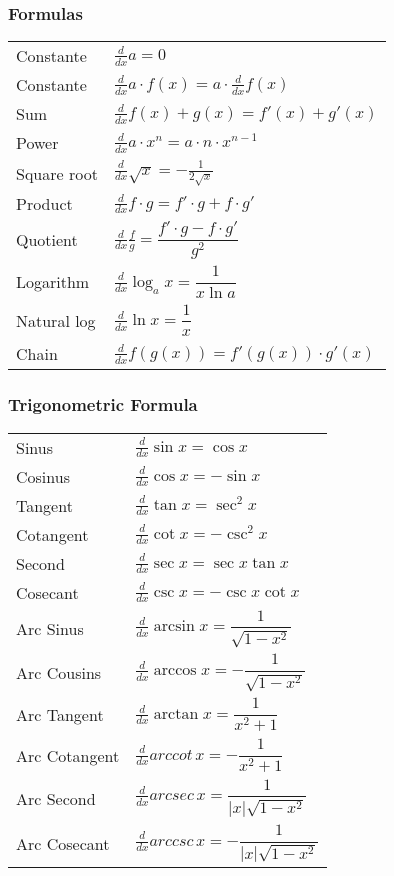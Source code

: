 \documentclass[5pt]{article}
\begin{document}
\begin{multicols}{3}
\subsubsection{Formulas}
\begin{tabular}{ll}
Constante & $\frac{d}{dx}a = 0$\\
Constante & $\frac{d}{dx}a\cdot f(x) = a\cdot\frac{d}{dx}f(x)$\\[1pt]
Sum & $\frac{d}{dx}f(x)+ g(x) = f'(x)+ g'(x)$\\[1pt]
Power & $\frac{d}{dx}a\cdot x^n = a\cdot n\cdot x^{n-1}$\\[1pt]
Square root & $\frac{d}{dx}\sqrt{x} = -\frac{1}{2\sqrt{x}}$\\[1pt]
Product & $\frac{d}{dx}f\cdot g = f'\cdot g + f\cdot g'$\\[1pt]
Quotient & $\frac{d}{dx}\frac{f}{g} = \dfrac{f'\cdot g - f\cdot g'}{g^2}$\\[1pt]
Logarithm & $\frac{d}{dx}\log_ax=\dfrac{1}{x\ln{a}}$\\[1pt]
Natural log & $\frac{d}{dx}\ln{x}=\dfrac{1}{x}$\\[1pt]
Chain & $\frac{d}{dx}f(g(x)) = f'(g(x))\cdot g'(x)$\\
\end{tabular}
\subsubsection{Trigonometric Formula}
\begin{tabular}{ll}
Sinus & $\frac{d}{dx}\sin{x} = \cos{x}$\\[1pt]
Cosinus & $\frac{d}{dx}\cos{x} = -\sin{x}$\\[1pt]
Tangent & $\frac{d}{dx}\tan{x} = \sec^2{x}$\\[1pt]
Cotangent & $\frac{d}{dx}\cot{x}=-\csc^2x$\\[1pt]
Second & $\frac{d}{dx}\sec{x}=\sec{x}\tan{x}$\\[1pt]
Cosecant & $\frac{d}{dx}\csc{x}=-\csc{x}\cot{x}$\\[1pt]

Arc Sinus & $\frac{d}{dx}\arcsin{x}=\dfrac{1}{\sqrt{1-x^2}}$\\[1pt]
Arc Cousins & $\frac{d}{dx}\arccos{x}=-\dfrac{1}{\sqrt{1-x^2}}$\\[1pt]
Arc Tangent & $\frac{d}{dx}\arctan{x}=\dfrac{1}{x^2+1}$\\[1pt]
Arc Cotangent & $\frac{d}{dx}arccot\, x=-\dfrac{1}{x^2+1}$\\[1pt]
Arc Second & $\frac{d}{dx}arcsec\,x=\dfrac{1}{|x|\sqrt{1-x^2}}$\\[1pt]
Arc Cosecant & $\frac{d}{dx}arccsc\,x=-\dfrac{1}{|x|\sqrt{1-x^2}}$\\[1pt]
\end{tabular}


\end{multicols}
\end{document}
